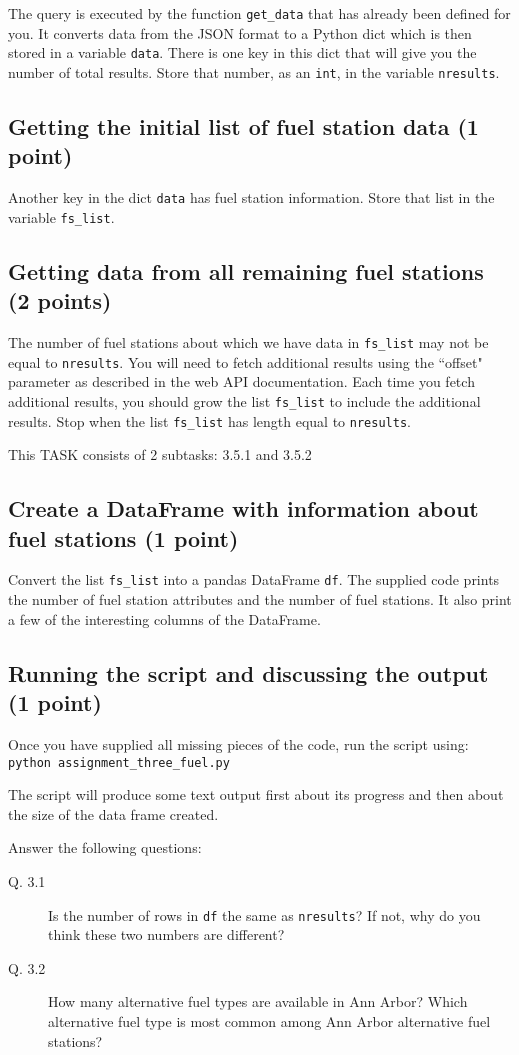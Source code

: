 \documentclass{article}
\begin{document}
The query is executed by the function {\tt get\_data} that has already been defined for you. It converts data from the JSON format
to a Python dict which is then stored in a variable {\tt data}. There is one key in this dict that will give you the number of total results.
Store that number, as an {\tt int}, in the variable {\tt nresults}.

\subsection{Getting the initial list of fuel station data (1 point)}

Another key in the dict {\tt data} has fuel station information. Store that list in the variable {\tt fs\_list}.

\subsection{Getting data from all remaining fuel stations (2 points)}

The number of fuel stations about which we have data in {\tt fs\_list} may not be equal to {\tt nresults}. You will need to fetch additional results
using the ``offset" parameter as described in the web API documentation. Each time you fetch additional results, you should grow the list
{\tt fs\_list} to include the additional results. Stop when the list {\tt fs\_list} has length equal to {\tt nresults}.

This TASK consists of 2 subtasks: 3.5.1 and 3.5.2

\subsection{Create a DataFrame with information about fuel stations (1 point)}

Convert the list {\tt fs\_list} into a pandas DataFrame {\tt df}. The supplied code prints the number of fuel station attributes and the number of fuel stations.
It also print a few of the interesting columns of the DataFrame.

\subsection{Running the script and discussing the output (1 point)}

Once you have supplied all missing pieces of the code, run the script using:\\
{\tt python assignment\_three\_fuel.py}

The script will produce some text output first about its progress and then about the size of the data frame created.

Answer the following questions:
\begin{description}
\item[Q. 3.1]
Is the number of rows in {\tt df} the same as {\tt nresults}? If not, why do you think these two numbers are different?
\item[Q. 3.2]
How many alternative fuel types are available in Ann Arbor? Which alternative fuel type is most common among Ann Arbor alternative fuel stations?
\end{description}
\end{document}
